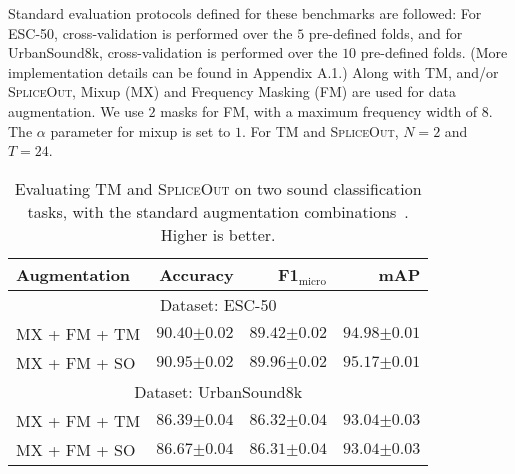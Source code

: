 \documentclass{article}
\newcommand{\SpA}{{\textsc{SpliceOut}}\xspace}
\begin{document}
Standard evaluation protocols defined for these benchmarks are followed: For ESC-50, cross-validation is performed over the $5$ pre-defined folds, and for UrbanSound8k, cross-validation is performed over the $10$ pre-defined folds. (More implementation details can be found in Appendix A.1.)
Along with TM, and/or \SpA, Mixup (MX) and Frequency Masking (FM) are used for data augmentation. We use $2$ masks for FM, with a maximum frequency width of $8$. The $\alpha$ parameter for mixup is set to $1$. For TM and \SpA, $N=2$ and $T=24$. 

\begin{table}
    \caption{Evaluating TM and \SpA on two sound classification tasks, with the standard augmentation combinations~\citep{urban,panns}. Higher is better.}
    \centering
    \begin{tabular}{l|rrr}
    \toprule
         Augmentation & Accuracy & F1$_\text{micro}$ & mAP \\
    \midrule
    \multicolumn{4}{c}{Dataset: ESC-50}\\
    \midrule
     MX + FM + TM & $90.40{\scriptstyle \pm 0.02}$ & $89.42{\scriptstyle \pm 0.02}$  & $94.98{\scriptstyle \pm 0.01}$\\
     MX + FM + SO & $90.95{\scriptstyle \pm 0.02}$ & $89.96{\scriptstyle \pm 0.02}$ & $95.17{\scriptstyle \pm 0.01}$\\
    \midrule
    \multicolumn{4}{c}{Dataset: UrbanSound8k}\\
    \midrule
    MX + FM + TM & $86.39{\scriptstyle \pm 0.04}$ & $\mathbf{86.32}{\scriptstyle \pm 0.04}$ & $\mathbf{93.04}{\scriptstyle \pm 0.03}$\\
    MX + FM + SO & $\mathbf{86.67}{\scriptstyle \pm 0.04}$ & $\mathbf{86.31}{\scriptstyle \pm 0.04}$ & $\mathbf{93.04}{\scriptstyle \pm 0.03}$\\
    \bottomrule
    \end{tabular}
    \label{tab:soundclass}
\end{table}
\end{document}
